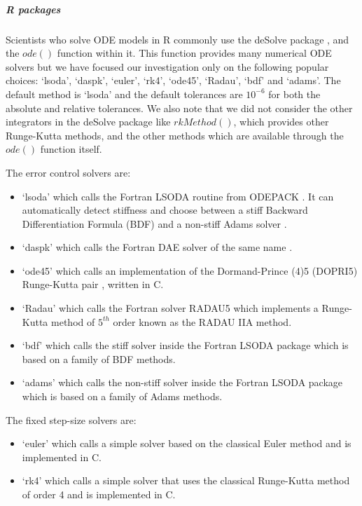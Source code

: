 \subparagraph{R packages}
Scientists who solve ODE models in R commonly use the deSolve package \cite{soetaert2010solving}, and the $ode()$ function within it.
This function provides many numerical ODE solvers but we have focused our investigation only on the following popular choices: `lsoda', `daspk', `euler', `rk4', `ode45', `Radau', `bdf' and `adams'. The default method is `lsoda' and the default tolerances are $10^{-6}$ for both the absolute and relative tolerances. We also note that we did not consider the other integrators in the deSolve package like $rkMethod()$, which provides other Runge-Kutta methods, and the other methods which are available through the $ode()$ function itself.

The error control solvers are:
\begin{itemize}
\item `lsoda' which calls the Fortran LSODA routine from ODEPACK \cite{MR751604}. It can automatically detect stiffness and choose between a stiff Backward Differentiation Formula (BDF) \cite{MR3822086} and a non-stiff Adams solver \cite{MR3822086}.

\item `daspk' which calls the Fortran DAE solver of the same name \cite{MR1379682}.

\item `ode45' which calls an implementation of the Dormand-Prince (4)5 (DOPRI5) Runge-Kutta pair \cite{MR3822086}, written in C.

\item `Radau' which calls the Fortran solver RADAU5 \cite{MR1439506} which implements a Runge-Kutta method of $5^{th}$ order known as the RADAU IIA method.

\item `bdf' which calls the stiff solver inside the Fortran LSODA package which is based on a family of BDF methods.

\item `adams' which calls the non-stiff solver inside the Fortran LSODA package which is based on a family of Adams methods.
\end{itemize}

The fixed step-size solvers are:
\begin{itemize}
\item `euler' which calls a simple solver based on the classical Euler method and is implemented in C.
\item `rk4' which calls a simple solver that uses the classical Runge-Kutta method of order 4 and is implemented in C. 
\end{itemize}

